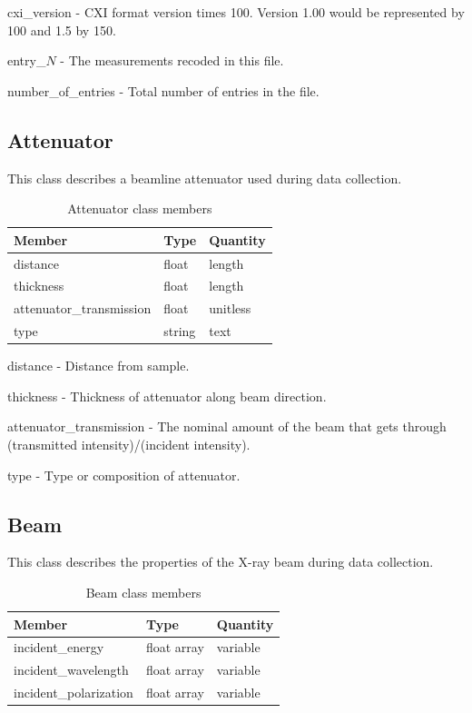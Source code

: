 \documentclass[usletter,11pt]{article}
\newcommand{\member}[2]
{ \noindent
{ \color{softBlue}  #1 - } #2
\vspace{0.2cm}
}
\begin{document}
\member{cxi\_version}{CXI format version times 100. Version 1.00 would
  be represented by 100 and 1.5 by 150.}

\member{entry\_$N$}{The measurements recoded in this file.}

\member{number\_of\_entries}{Total number of entries in the file.}

\subsection{Attenuator}
\label{table:attenuator}

This class describes a beamline attenuator used during data collection.

\begin{table}[h!]\sffamily \footnotesize
\caption{Attenuator class members}

\begin{tabular}{p{4.5cm} p{4.5cm}  p{2.5cm}}
\toprule
\bfseries Member     & \bfseries Type & \bfseries Quantity \\
\midrule
distance & float & length \\
thickness & float & length \\
attenuator\_transmission & float & unitless \\ 
type & string & text \\
\bottomrule
\end{tabular}
\end{table}

\member{distance}{Distance from sample.}

\member{thickness}{Thickness of attenuator along beam direction.}

\member{attenuator\_transmission}{The nominal amount of the beam that
gets through (transmitted intensity)/(incident intensity).}

\member{type}{Type or composition of attenuator.}

\subsection{Beam}
\label{table:beam}

This class describes the properties of the X-ray beam during data collection.

\begin{table}[h!]\sffamily \footnotesize
	\caption{Beam class members}
	
	\begin{tabular}{p{4.5cm} p{4.5cm}  p{2.5cm} }
		\toprule
		\bfseries Member     & \bfseries Type & \bfseries Quantity \\
		\midrule
	   incident\_energy  & float array & variable  \\
       incident\_wavelength & float array & variable \\
       incident\_polarization & float array & variable \\
		\bottomrule
	\end{tabular}
\end{table}
\end{document}
